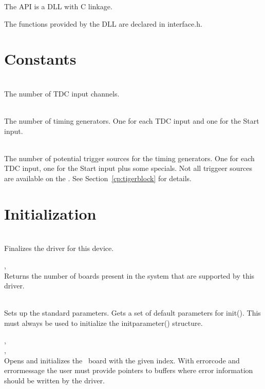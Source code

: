 The API is a DLL with C linkage.\par

The functions provided by the DLL are declared in \textsf{\tu interface.h}.

\section{Constants}

	\\
	The number of TDC input channels.\par

	 \\
	The number of timing generators. One for each TDC input and one for the Start input.\par

	 \\
	The number of potential trigger sources for the timing generators. One for each TDC input, one for the Start input plus some specials. 
	Not all triggeer sources are available on the \deviceName . See Section~\ref{cp:tigerblock} for details.\par

\section{Initialization}
		\\
		Finalizes the driver for this device.

		, \\
		Returns the number of boards present in the system that are supported by this driver.\par

		\\
		Sets up the standard parameters. Gets a set of default parameters for \textsf{\prefix init()}. This must always be used to initialize the \textsf{\prefix init\tu parameter()} structure.\par

		, \\ , \\
		Opens and initializes the \deviceName\ board with the given index. 
		With \textsf{error\tu code} and \textsf{error\tu message} the user must provide pointers to buffers where error information should be written by the driver.\par

